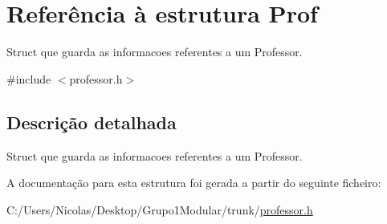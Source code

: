 \hypertarget{struct_prof}{}\section{Referência à estrutura Prof}
\label{struct_prof}


Struct que guarda as informacoes referentes a um Professor.  




{\ttfamily \#include $<$professor.\+h$>$}



\subsection{Descrição detalhada}
Struct que guarda as informacoes referentes a um Professor. 

A documentação para esta estrutura foi gerada a partir do seguinte ficheiro\+:\begin{DoxyCompactItemize}
\item 
C\+:/\+Users/\+Nicolas/\+Desktop/\+Grupo1\+Modular/trunk/\hyperlink{professor_8h}{professor.\+h}\end{DoxyCompactItemize}
